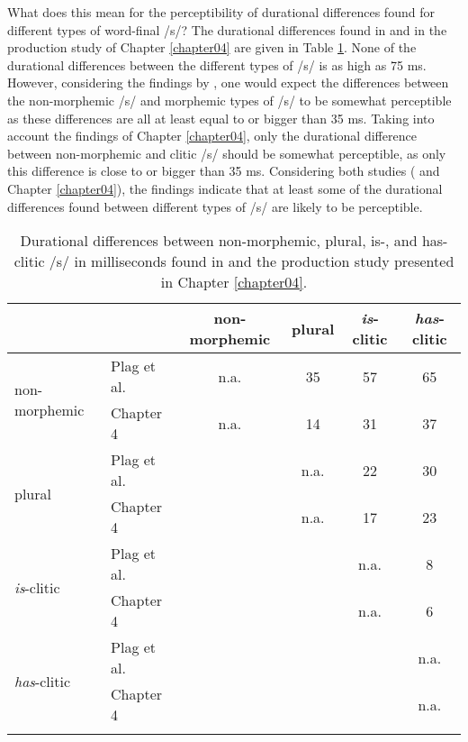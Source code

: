 What does this mean for the perceptibility of durational differences found for different types of word-final /s/? The durational differences found in \citet{Plag2017} and in the production study of Chapter \ref{chapter04} are given in Table \ref{tab:6.13}. None of the durational differences between the different types of /s/ is as high as 75 ms. However, considering the findings by \citet{Plag2017}, one would expect the differences between the non-morphemic /s/ and morphemic types of /s/ to be somewhat perceptible as these differences are all at least equal to or bigger than 35 ms. Taking into account the findings of Chapter \ref{chapter04}, only the durational difference between non-morphemic and clitic /s/ should be somewhat perceptible, as only this difference is close to or bigger than 35 ms. Considering both studies (\cite{Plag2017} and Chapter \ref{chapter04}), the findings indicate that at least some of the durational differences found between different types of /s/ are likely to be perceptible.

\begin{table}\fontsize{10}{11}
\caption{Durational differences between non-morphemic, plural, \mbox{is-,} and has-clitic /s/ in milliseconds found in \citet{Plag2017} and the production study presented in Chapter \ref{chapter04}.}
\label{tab:6.13}
\centering
\begin{tabular}{llcccc} 
\lsptoprule
\textbf{~}                           & ~           & non-morphemic & plural & \textit{is}-clitic & \textit{has}-clitic  \\ 
\midrule
\multirow{2}{*}{non-morphemic}       & Plag et al. & n.a.          & 35     & 57                 & 65                   \\
                                     & Chapter 4   & n.a.          & 14     & 31                 & 37                   \\ 
\midrule
\multirow{2}{*}{plural}              & Plag et al. & ~             & n.a.   & 22                 & 30                   \\
                                     & Chapter 4   & ~             & n.a.   & 17                 & 23                   \\ 
\midrule
\multirow{2}{*}{\textit{is}-clitic}  & Plag et al. & ~             & ~      & n.a.               & 8                    \\
                                     & Chapter 4   & ~             & ~      & n.a.               & 6                    \\ 
\midrule
\multirow{2}{*}{\textit{has}-clitic} & Plag et al. & ~             & ~      & ~                  & n.a.                 \\
                                     & Chapter 4   & ~             & ~      & ~                  & n.a.                 \\
\lspbottomrule
\end{tabular}
\end{table}

